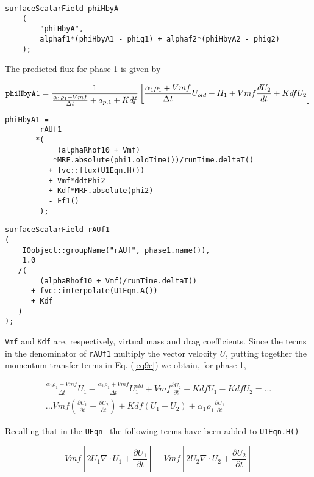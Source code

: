 \documentclass[a4paper, 12 pt, fleqn]{article}
\begin{document}
{ \begin{lstlisting}[frame=single] 
    surfaceScalarField phiHbyA
    (
        "phiHbyA",
        alphaf1*(phiHbyA1 - phig1) + alphaf2*(phiHbyA2 - phig2)
    );
 \end{lstlisting} \label{lst8}
 
 The predicted flux for phase 1 is given by
 
\begin{equation}\label{eq9c}
{\tt phiHbyA1} = \frac{1}{\frac{\alpha_1 \rho_1 + Vmf}{\Delta t} + a_{p,1} + Kdf}\left[ \frac{\alpha_1 \rho_1 + Vmf}{\Delta t}U_{old} + H_1 + Vmf\frac{dU_2}{dt} + KdfU_2 \right]
\end{equation} 

\begin{lstlisting}[frame=single] 
    phiHbyA1 =
        rAUf1
       *(
            (alphaRhof10 + Vmf)
           *MRF.absolute(phi1.oldTime())/runTime.deltaT()
          + fvc::flux(U1Eqn.H())
          + Vmf*ddtPhi2
          + Kdf*MRF.absolute(phi2)
          - Ff1()
        );
\end{lstlisting} \label{lst9}

\begin{lstlisting}[frame=single] 
surfaceScalarField rAUf1
(
    IOobject::groupName("rAUf", phase1.name()),
    1.0
   /(
        (alphaRhof10 + Vmf)/runTime.deltaT()
      + fvc::interpolate(U1Eqn.A())
      + Kdf
   )
);
\end{lstlisting} \label{lst10}

{\tt Vmf} and {\tt Kdf} are, respectively, virtual mass and drag coefficients. Since the terms in the denominator of {\tt rAUf1} multiply the vector velocity $U$, putting together the momentum transfer terms in Eq. (\ref{eq9c}) we obtain, for phase 1, 

\begin{eqnarray}
\frac{\alpha_1 \rho_1 + Vmf}{\Delta t}U_1 - \frac{\alpha_1 \rho_1 + Vmf}{\Delta t}U_{1}^{old}  + Vmf\frac{\partial U_2}{\partial t} + Kdf U_1 - Kdf U_2 = ...\\
...Vmf\left( \frac{\partial U_1}{\partial t} - \frac{\partial U_2}{\partial t} \right) + Kdf\left(U_1 - U_2\right) + \alpha_1 \rho_1 \frac{\partial U_1}{\partial t}
\end{eqnarray}

Recalling that in the {\tt UEqn } the following terms have been added to {\tt U1Eqn.H()}

\begin{equation}
Vmf \left[ 2 U_1 \nabla \cdot U_1 + \frac{\partial U_1}{\partial t} \right] - Vmf \left[ 2 U_2 \nabla \cdot U_2 + \frac{\partial U_2}{\partial t} \right]
\end{equation}

}
\end{document}
